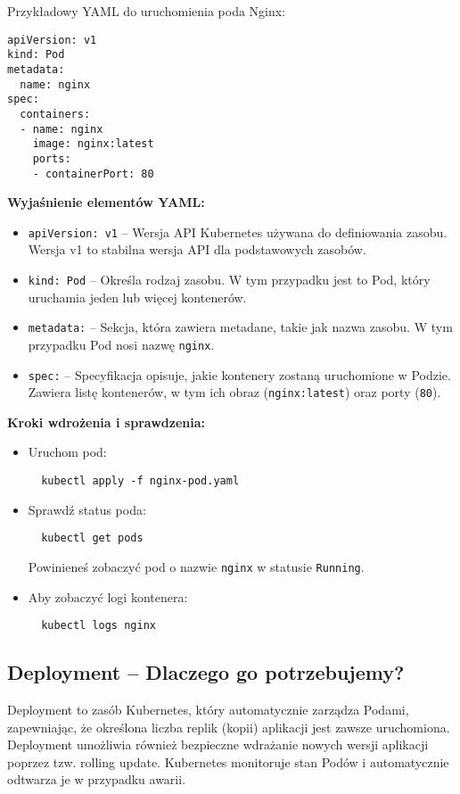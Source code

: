 \documentclass{article}
\begin{document}
Przykładowy YAML do uruchomienia poda Nginx:
\begin{lstlisting}
apiVersion: v1
kind: Pod
metadata:
  name: nginx
spec:
  containers:
  - name: nginx
    image: nginx:latest
    ports:
    - containerPort: 80
\end{lstlisting}

\textbf{Wyjaśnienie elementów YAML:}
\begin{itemize}
  \item \texttt{apiVersion: v1} – Wersja API Kubernetes używana do definiowania zasobu. Wersja v1 to stabilna wersja API dla podstawowych zasobów.
  \item \texttt{kind: Pod} – Określa rodzaj zasobu. W tym przypadku jest to Pod, który uruchamia jeden lub więcej kontenerów.
  \item \texttt{metadata:} – Sekcja, która zawiera metadane, takie jak nazwa zasobu. W tym przypadku Pod nosi nazwę \texttt{nginx}.
  \item \texttt{spec:} – Specyfikacja opisuje, jakie kontenery zostaną uruchomione w Podzie. Zawiera listę kontenerów, w tym ich obraz (\texttt{nginx:latest}) oraz porty (\texttt{80}).
\end{itemize}

\textbf{Kroki wdrożenia i sprawdzenia:}
\begin{itemize}
  \item Uruchom pod:
  \begin{lstlisting}
  kubectl apply -f nginx-pod.yaml
  \end{lstlisting}
  \item Sprawdź status poda:
  \begin{lstlisting}
  kubectl get pods
  \end{lstlisting}
  Powinieneś zobaczyć pod o nazwie \texttt{nginx} w statusie \texttt{Running}.
  \item Aby zobaczyć logi kontenera:
  \begin{lstlisting}
  kubectl logs nginx
  \end{lstlisting}
\end{itemize}

\subsection{Deployment – Dlaczego go potrzebujemy?}
Deployment to zasób Kubernetes, który automatycznie zarządza Podami, zapewniając, że określona liczba replik (kopii) aplikacji jest zawsze uruchomiona. Deployment umożliwia również bezpieczne wdrażanie nowych wersji aplikacji poprzez tzw. rolling update. Kubernetes monitoruje stan Podów i automatycznie odtwarza je w przypadku awarii.
\end{document}
